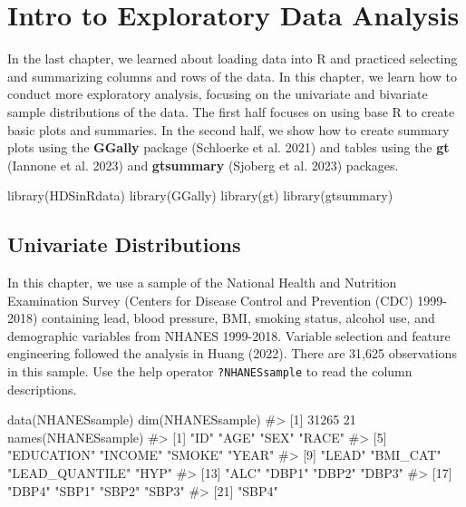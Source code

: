 \documentclass[
  letterpaper,
]{latex/krantz}
\makeatletter
\newenvironment{Shaded}{\begin{snugshade}}{\end{snugshade}}
\newcommand{\CommentTok}[1]{\textcolor[rgb]{0.37,0.37,0.37}{#1}}
\newcommand{\FunctionTok}[1]{\textcolor[rgb]{0.28,0.35,0.67}{#1}}
\newcommand{\NormalTok}[1]{\textcolor[rgb]{0.00,0.23,0.31}{#1}}
\newenvironment{kframe}{%
\medskip{}
\setlength{\fboxsep}{.8em}
 \def\at@end@of@kframe{}%
 \ifinner\ifhmode%
  \def\at@end@of@kframe{\end{minipage}}%
  \begin{minipage}{\columnwidth}%
 \fi\fi%
 \def\FrameCommand##1{\hskip\@totalleftmargin \hskip-\fboxsep
 \colorbox{shadecolor}{##1}\hskip-\fboxsep
     \hskip-\linewidth \hskip-\@totalleftmargin \hskip\columnwidth}%
 \MakeFramed {\advance\hsize-\width
   \@totalleftmargin\z@ \linewidth\hsize
   \@setminipage}}%
 {\par\unskip\endMakeFramed%
 \at@end@of@kframe}
\renewenvironment{Shaded}{\begin{kframe}}{\end{kframe}}
\makeatother
\begin{document}
\chapter{Intro to Exploratory Data Analysis}\label{sec-exploratory}

In the last chapter, we learned about loading data into R and practiced
selecting and summarizing columns and rows of the data. In this chapter,
we learn how to conduct more exploratory analysis, focusing on the
univariate and bivariate sample distributions of the data. The first
half focuses on using base R to create basic plots and summaries. In the
second half, we show how to create summary plots using the
\textbf{GGally} package (Schloerke et al. 2021)
 and tables using the \textbf{gt} (Iannone et
al. 2023)  and \textbf{gtsummary} (Sjoberg et al.
2023)  packages.

\begin{Shaded}
\begin{Highlighting}[]
\FunctionTok{library}\NormalTok{(HDSinRdata)}
\FunctionTok{library}\NormalTok{(GGally) }
\FunctionTok{library}\NormalTok{(gt)}
\FunctionTok{library}\NormalTok{(gtsummary)}
\end{Highlighting}
\end{Shaded}

\section{\texorpdfstring{Univariate Distributions
}{Univariate Distributions  }}\label{univariate-distributions}

In this chapter, we use a sample of the National Health and Nutrition
Examination Survey (Centers for Disease Control and Prevention (CDC)
1999-2018) containing lead, blood pressure, BMI, smoking status, alcohol
use, and demographic variables from NHANES
1999-2018. Variable
selection and feature engineering followed the analysis in Huang (2022).
There are 31,625 observations in this sample. Use the help operator
\texttt{?NHANESsample} to read the column descriptions.

\begin{Shaded}
\begin{Highlighting}[]
\FunctionTok{data}\NormalTok{(NHANESsample)}
\FunctionTok{dim}\NormalTok{(NHANESsample)}
\CommentTok{\#\textgreater{} [1] 31265    21}
\FunctionTok{names}\NormalTok{(NHANESsample)}
\CommentTok{\#\textgreater{}  [1] "ID"            "AGE"           "SEX"           "RACE"         }
\CommentTok{\#\textgreater{}  [5] "EDUCATION"     "INCOME"        "SMOKE"         "YEAR"         }
\CommentTok{\#\textgreater{}  [9] "LEAD"          "BMI\_CAT"       "LEAD\_QUANTILE" "HYP"          }
\CommentTok{\#\textgreater{} [13] "ALC"           "DBP1"          "DBP2"          "DBP3"         }
\CommentTok{\#\textgreater{} [17] "DBP4"          "SBP1"          "SBP2"          "SBP3"         }
\CommentTok{\#\textgreater{} [21] "SBP4"}
\end{Highlighting}
\end{Shaded}
\end{document}
